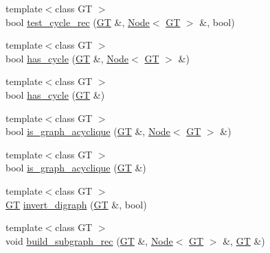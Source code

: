 \begin{DoxyCompactItemize}
\item 
{\footnotesize template$<$class GT $>$ }\\bool \hyperlink{namespace_designar_a1d3028c78c40ec397096fb112f34eb78}{test\+\_\+cycle\+\_\+rec} (\hyperlink{demo-buildgraph_8_c_a3001c40d2c31ca87ed96cd7d1334a55e}{GT} \&, \hyperlink{namespace_designar_a5af326c65aa2bd26b26c410f2030d09e}{Node}$<$ \hyperlink{demo-buildgraph_8_c_a3001c40d2c31ca87ed96cd7d1334a55e}{GT} $>$ \&, bool)
\item 
{\footnotesize template$<$class GT $>$ }\\bool \hyperlink{namespace_designar_a279a11030cf78659ddbdec00473f0365}{has\+\_\+cycle} (\hyperlink{demo-buildgraph_8_c_a3001c40d2c31ca87ed96cd7d1334a55e}{GT} \&, \hyperlink{namespace_designar_a5af326c65aa2bd26b26c410f2030d09e}{Node}$<$ \hyperlink{demo-buildgraph_8_c_a3001c40d2c31ca87ed96cd7d1334a55e}{GT} $>$ \&)
\item 
{\footnotesize template$<$class GT $>$ }\\bool \hyperlink{namespace_designar_a4b250ae7cdab37b1a1489179266ef5d6}{has\+\_\+cycle} (\hyperlink{demo-buildgraph_8_c_a3001c40d2c31ca87ed96cd7d1334a55e}{GT} \&)
\item 
{\footnotesize template$<$class GT $>$ }\\bool \hyperlink{namespace_designar_a745761588a29956929fda0d246ebbef5}{is\+\_\+graph\+\_\+acyclique} (\hyperlink{demo-buildgraph_8_c_a3001c40d2c31ca87ed96cd7d1334a55e}{GT} \&, \hyperlink{namespace_designar_a5af326c65aa2bd26b26c410f2030d09e}{Node}$<$ \hyperlink{demo-buildgraph_8_c_a3001c40d2c31ca87ed96cd7d1334a55e}{GT} $>$ \&)
\item 
{\footnotesize template$<$class GT $>$ }\\bool \hyperlink{namespace_designar_a2cf5f0717993e7d2a4dbc26ff8380a72}{is\+\_\+graph\+\_\+acyclique} (\hyperlink{demo-buildgraph_8_c_a3001c40d2c31ca87ed96cd7d1334a55e}{GT} \&)
\item 
{\footnotesize template$<$class GT $>$ }\\\hyperlink{demo-buildgraph_8_c_a3001c40d2c31ca87ed96cd7d1334a55e}{GT} \hyperlink{namespace_designar_a35a0d2875876e94cc6f9036f85491091}{invert\+\_\+digraph} (\hyperlink{demo-buildgraph_8_c_a3001c40d2c31ca87ed96cd7d1334a55e}{GT} \&, bool)
\item 
{\footnotesize template$<$class GT $>$ }\\void \hyperlink{namespace_designar_a035e48f6f48994ed7b1fd8c6d7f3ec32}{build\+\_\+subgraph\+\_\+rec} (\hyperlink{demo-buildgraph_8_c_a3001c40d2c31ca87ed96cd7d1334a55e}{GT} \&, \hyperlink{namespace_designar_a5af326c65aa2bd26b26c410f2030d09e}{Node}$<$ \hyperlink{demo-buildgraph_8_c_a3001c40d2c31ca87ed96cd7d1334a55e}{GT} $>$ \&, \hyperlink{demo-buildgraph_8_c_a3001c40d2c31ca87ed96cd7d1334a55e}{GT} \&)

\end{DoxyCompactItemize}
